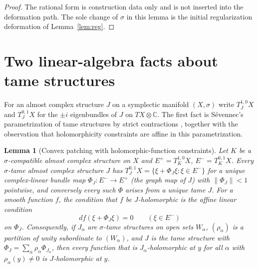 \documentclass[11pt]{article}
\newtheorem{lemma}[theorem]{Lemma}
\theoremstyle{remark}
\newcommand{\C}{\mathbb C}
\begin{document}
\begin{proof}
The rational form is construction data only and is not inserted into
the deformation path. The sole change of $\sigma$ in this lemma is the
initial regularization deformation of Lemma~\ref{lem:reg}.
\end{proof}

\section{Two linear-algebra facts about tame structures}\label{sec:linear}

For an almost complex structure $J$ on a symplectic manifold $(X,\sigma)$
write $T^{1,0}_JX$ and $T^{0,1}_JX$ for
the $\pm i$ eigenbundles of $J$ on $TX\otimes\C$. The first fact is
S\'evennec's parametrization of tame structures by strict contractions
\cite[Theorem 2.37]{Wendl}, together with the observation that
holomorphicity constraints are affine in this parametrization.

\begin{lemma}[Convex patching with holomorphic-function constraints]
\label{lem:convex}
Let $K$ be a $\sigma$-compatible almost complex structure on $X$ and
$E^+=T^{1,0}_KX$, $E^-=T^{0,1}_KX$. Every $\sigma$-tame almost complex
structure $J$ has $T^{0,1}_JX=\{\xi+\Phi_J\xi:\xi\in E^-\}$ for a unique
complex-linear bundle map $\Phi_J\colon E^-\to E^+$ (the \emph{graph
map} of $J$) with $\lVert\Phi_J\rVert<1$ pointwise, and conversely every
such $\Phi$ arises from a unique tame $J$. For a smooth function $f$,
the condition that $f$ be $J$-holomorphic is the affine linear condition
\begin{equation}\label{eq:affine}
 df(\xi+\Phi_J\xi)=0\qquad(\xi\in E^-)
\end{equation}
on $\Phi_J$. Consequently, if $J_\alpha$ are $\sigma$-tame structures on
open sets $W_\alpha$, $(\rho_\alpha)$ is a partition of unity
subordinate to $(W_\alpha)$, and $J$ is the tame structure with
$\Phi_J=\sum_\alpha\rho_\alpha\Phi_{J_\alpha}$, then every function that
is $J_\alpha$-holomorphic at $y$ for all $\alpha$ with $\rho_\alpha(y)\ne0$
is $J$-holomorphic at $y$.
\end{lemma}
\end{document}
